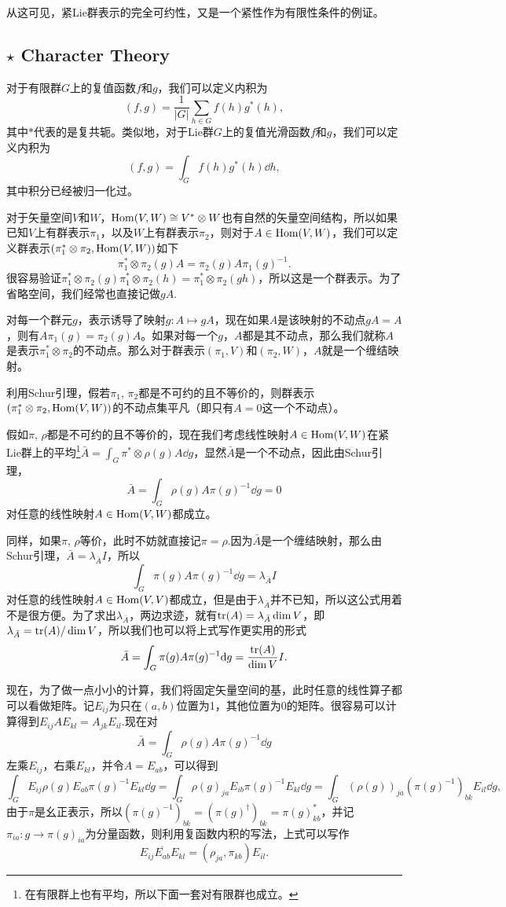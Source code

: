 \documentclass[9pt]{extarticle}
\begin{document}
从这可见，紧Lie群表示的完全可约性，又是一个紧性作为有限性条件的例证。

\subsection*{$\star$ Character Theory}

\para 对于有限群$G$上的复值函数$f$和$g$，我们可以定义内积为
\[
	(f,g)=\frac{1}{|G|}\sum_{h\in G} f(h)g^*(h),
\]
其中$*$代表的是复共轭。类似地，对于Lie群$G$上的复值光滑函数$f$和$g$，我们可以定义内积为
\[
	(f,g)=\int_G f(h)g^*(h)\dd h,
\]
其中积分已经被归一化过。

\para 对于矢量空间$V$和$W$，$\operatorname{Hom}(V,W)\cong V^*\otimes W$也有自然的矢量空间结构，所以如果已知$V$上有群表示$\pi_1$，以及$W$上有群表示$\pi_2$，则对于$A\in \operatorname{Hom}(V,W)$，我们可以定义群表示$(\pi_1^*\otimes\pi_2,\operatorname{Hom}(V,W))$如下
\[
	\pi_1^*\otimes\pi_2(g)A=\pi_2(g)A\pi_1(g)^{-1}.
\]
很容易验证$\pi_1^*\otimes\pi_2(g)\pi_1^*\otimes\pi_2(h)=\pi_1^*\otimes\pi_2(gh)$，所以这是一个群表示。为了省略空间，我们经常也直接记做$gA$.

对每一个群元$g$，表示诱导了映射$g:A\mapsto gA$，现在如果$A$是该映射的不动点$gA=A$，则有$A\pi_1(g)=\pi_2(g)A$。如果对每一个$g$，$A$都是其不动点，那么我们就称$A$是表示$\pi_1^*\otimes\pi_2$的不动点。那么对于群表示$(\pi_1,V)$和$(\pi_2,W)$，$A$就是一个缠结映射。

\para 利用Schur引理，假若$\pi_1$, $\pi_2$都是不可约的且不等价的，则群表示$(\pi_1^*\otimes\pi_2,\operatorname{Hom}(V,W))$的不动点集平凡（即只有$A=0$这一个不动点）。

假如$\pi$, $\rho$都是不可约的且不等价的，现在我们考虑线性映射$A\in \operatorname{Hom}(V,W)$在紧Lie群上的平均\footnote{在有限群上也有平均，所以下面一套对有限群也成立。}$\bar{A}=\int_G \pi^*\otimes\rho(g)A \dd g$，显然$\bar{A}$是一个不动点，因此由Schur引理，
\[
	\bar{A}=\int_G \rho(g)A\pi(g)^{-1}\dd g=0
\]
对任意的线性映射$A\in \operatorname{Hom}(V,W)$都成立。

同样，如果$\pi$, $\rho$等价，此时不妨就直接记$\pi=\rho$.因为$\bar{A}$是一个缠结映射，那么由Schur引理，$\bar{A}=\lambda_{\bar{A}} I$，所以
\[
	\int_G \pi(g)A\pi(g)^{-1}\dd g=\lambda_{\bar{A}} I
\]
对任意的线性映射$A\in \operatorname{Hom}(V,V)$都成立，但是由于$\lambda_{\bar{A}}$并不已知，所以这公式用着不是很方便。为了求出$\lambda_{\bar{A}}$，两边求迹，就有$\operatorname{tr}(A)=\lambda_{\bar{A}} \dim V$，即$\lambda_{\bar{A}}=\operatorname{tr}(A)/\dim V$，所以我们也可以将上式写作更实用的形式
\[
	\bar{A}=\int_G \pi(g)A\pi(g)^{-1}\mathrm{d} g=\frac{\operatorname{tr}(A)}{\dim V}I.
\]

\para 现在，为了做一点小小的计算，我们将固定矢量空间的基，此时任意的线性算子都可以看做矩阵。记$E_{ij}$为只在$(a,b)$位置为1，其他位置为0的矩阵。很容易可以计算得到$E_{ij}AE_{kl}=A_{jk}E_{il}$.现在对
\[
	\bar{A}=\int_G \rho(g)A\pi(g)^{-1}\dd g
\]
左乘$E_{ij}$，右乘$E_{kl}$，并令$A=E_{ab}$，可以得到
\[
	\int_G E_{ij}\rho(g)E_{ab}\pi(g)^{-1}E_{kl}\dd g=\int_G \rho(g)_{ja}E_{ib}\pi(g)^{-1}E_{kl}\dd g=\int_G (\rho(g))_{ja}\left(\pi(g)^{-1}\right)_{bk}E_{il}\dd g,
\]
由于$\pi$是幺正表示，所以$\left(\pi(g)^{-1}\right)_{bk}=\left(\pi(g)^{\dag}\right)_{bk}=\pi(g)_{kb}^*$，并记$\pi_{ia}:g\to \pi(g)_{ia}$为分量函数，则利用复函数内积的写法，上式可以写作
\[
	E_{ij}\overline{E_{ab}}E_{kl}=\left(\rho_{ja},\pi_{kb}\right)E_{il}.
\]
\end{document}
